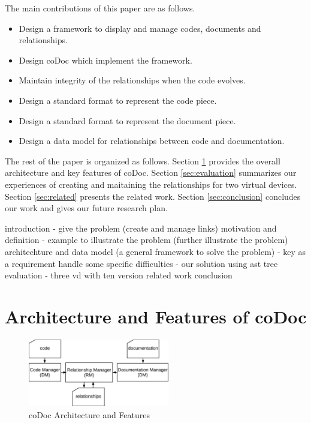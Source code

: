 \documentclass[runningheads,a4paper]{llncs}
\begin{document}
The main contributions of this paper are as follows.
\begin{itemize}
\item Design a framework to display and manage codes, documents and relationships.
\item Design coDoc which implement the framework.
\item Maintain integrity of the relationships when the code evolves.
\item Design a standard format to represent the code piece.
\item Design a standard format to represent the document piece.
\item Design a data model for relationships between code and documentation.
\end{itemize}

The rest of the paper is organized as follows. 
Section \ref{sec:arch} provides the overall architecture and key features of coDoc.
Section \ref{sec:evaluation} summarizes our experiences of creating and maitaining the relationships for two virtual devices.
Section \ref{sec:related} presents the related work.
Section \ref{sec:conclusion} concludes our work and gives our future research plan.

introduction - give the problem (create and manage links)
motivation and definition - example to illustrate the problem (further illustrate the problem)
architechture and data model (a general framework to solve the problem) - key as a requirement
handle some specific difficulties - our solution using ast tree
evaluation - three vd with ten version
related work
conclusion

\section{Architecture and Features of coDoc}
\label{sec:arch}

\begin{figure}
\begin{center}
\includegraphics[width=0.55\textwidth]{architecture}
\caption{coDoc Architecture and Features}
\label{fig:architecture}
\end{center}
\end{figure}
\end{document}
